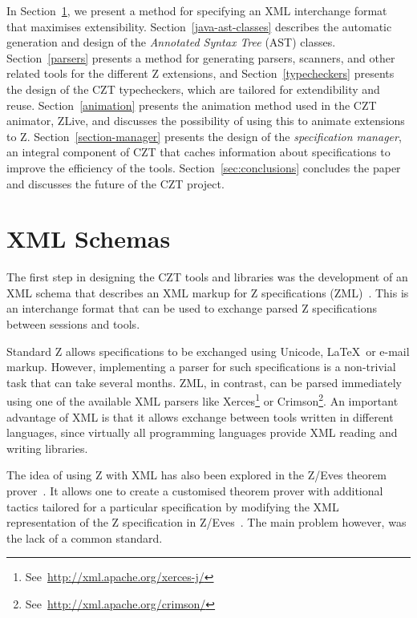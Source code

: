 \documentclass{llncs}
\begin{document}
  In Section~\ref{xml-schemas}, we present a method for specifying an
  XML interchange format that maximises extensibility.
  Section~\ref{java-ast-classes} describes the automatic generation
  and design of the \emph{Annotated Syntax Tree} (AST) classes.
  Section~\ref{parsers} presents a method for generating parsers,
  scanners, and other related tools for the different Z extensions,
  and Section~\ref{typecheckers} presents the design of the CZT
  typecheckers, which are tailored for extendibility and
  reuse. Section~\ref{animation} presents the animation method used in
  the CZT animator, ZLive, and discusses the possibility of using this
  to animate extensions to Z. Section~\ref{section-manager} presents
  the design of the {\em specification manager}, an integral component
  of CZT that caches information about specifications to improve the
  efficiency of the tools.  Section~\ref{sec:conclusions} concludes
  the paper and discusses the future of the CZT project.


\section{XML Schemas}
\label{xml-schemas}

  The first step in designing the CZT tools and libraries was the
  development of an XML schema that describes an XML markup for Z
  specifications (ZML)~\cite{UttEA:03}.  This is an interchange format
  that can be used to exchange parsed Z specifications between
  sessions and tools.

  Standard Z allows specifications to be exchanged using Unicode,
  \LaTeX\ or e-mail markup.  However, implementing a parser for such
  specifications is a non-trivial task that can take several months.
  ZML, in contrast, can be parsed
  immediately using one of the available XML parsers like
  Xerces\footnote{See~\url{http://xml.apache.org/xerces-j/}} or
  Crimson\footnote{See~\url{http://xml.apache.org/crimson/}}.
  An important advantage of XML is that it allows
  exchange between tools written in different languages, since virtually
  all programming languages provide XML reading and writing libraries.

  The idea of using Z with XML has also been explored in the
  Z/Eves theorem prover~\cite{tp.tools:zeves.ref}.  It allows one to
  create a customised theorem prover with additional tactics tailored
  for a particular specification by modifying the XML representation
  of the Z specification in Z/Eves~\cite{tp.tools:zeves.api}.
  The main problem however, was the lack of a common standard.
\end{document}
